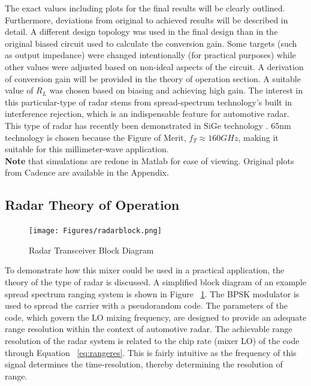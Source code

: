 \documentclass{article}                                                         %
\begin{document}
The exact values including plots for the final results will be clearly outlined. Furthermore, deviations from original to achieved results
will be described in detail. A different design topology was used in the final design than in the original biased circuit used to calculate
the conversion gain. Some targets (such as output impedance) were changed intentionally (for practical purposes) while other values
were adjusted based on non-ideal aspects of the circuit.\vspace{3mm}
A derivation of conversion gain will be provided in the theory of operation section. A suitable value of $R_L$ was chosen
based on biasing and achieving high gain.
The interest in this particular-type of radar stems from spread-spectrum technology's built in interference rejection, which
is an indispensable feature for automotive radar. This type of radar has recently been demonstrated in
SiGe technology \cite{trotta200779ghz, ng2014fully}. 65nm technology is chosen because the Figure of Merit, $f_T \approx 160GHz $, making it suitable for
this millimeter-wave application.\\

\textbf{Note} that simulations are redone in Matlab for ease of viewing. Original plots from Cadence are available in the Appendix.

\newpage
\subsection{Radar Theory of Operation}

\begin{figure}
  \begin{center}
    \texttt{[image: Figures/radarblock.png]}
    \caption{Radar Transceiver Block Diagram}
    \label{fig:radartrans}
  \end{center}
\end{figure}
To demonstrate how this mixer could be used in a practical application, the theory of the type of radar is discussed.
A simplified block diagram of an example spread spectrum ranging system is shown in Figure ~\ref{fig:radartrans}.
The BPSK modulator is used to spread the carrier with a pseudorandom code. The parameters of the code, which govern
the LO mixing frequency, are designed to provide an adequate range resolution within the context of automotive radar.
The achievable range resolution of the radar system is related to the chip rate (mixer LO) of the code through
Equation ~\ref{eq:rangeres}. This is fairly intuitive as the frequency of this signal determines the time-resolution,
thereby determining the resolution of range. \\
\end{document}
